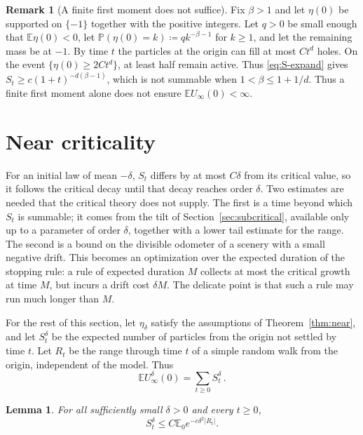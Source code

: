\documentclass[11pt]{amsart}
\theoremstyle{plain}
\newtheorem{lemma}[theorem]{Lemma}
\theoremstyle{definition}
\newtheorem{remark}[theorem]{Remark}
\newcommand{\E}{\mathbb{E}}
\renewcommand{\P}{\mathbb{P}}
\begin{document}
\begin{remark}[A finite first moment does not suffice]\label{rem:first-moment}
	Fix $\beta>1$ and let $\eta(0)$ be supported on $\{-1\}$ together with
	the positive integers. Let $q>0$ be small enough that
	$\E\eta(0)<0$, let $\P(\eta(0)=k)\coloneqq qk^{-\beta-1}$ for $k\geq1$,
	and let the remaining mass be at $-1$. By time $t$ the
	particles at the origin can fill at most $Ct^d$ holes. On the event
	$\{\eta(0)\geq2Ct^d\}$, at least half remain active. Thus
	\eqref{eq:S-expand} gives $S_t\geq c(1+t)^{-d(\beta-1)}$, which is not
	summable when $1<\beta\leq1+1/d$. Thus a finite first moment alone does not
	ensure $\E U_\infty(0)<\infty$.
\end{remark}

\section{Near criticality}\label{sec:near}

For an initial law of mean $-\delta$, $S_t$ differs by at most $C\delta$ from
its critical value, so it follows the critical decay until that decay reaches
order $\delta$. Two estimates are needed that the
critical theory does not supply. The first is a time beyond which $S_t$
is summable; it comes from the tilt of Section~\ref{sec:subcritical},
available only up to a parameter of order $\delta$, together with a lower tail
estimate for the range. The second is a bound on the divisible odometer of a
scenery with a small negative drift. This becomes an optimization over the expected duration of the stopping rule: a rule of expected duration $M$ collects at most the critical growth at time $M$, but incurs a drift cost $\delta M$. The delicate point is that such a rule may
run much longer than $M$.

For the rest of this section, let $\eta_\delta$ satisfy the assumptions of
Theorem~\ref{thm:near}, and let $S_t^\delta$ be the expected number of particles
from the origin not settled by time $t$. Let $R_t$ be the range through time
$t$ of a simple random walk from the origin, independent of the model. Thus
\[
	\E U_\infty^\delta(0)=\sum_{t\geq0}S_t^\delta\,.
\]

\begin{lemma}\label{lem:near-tilt}
	For all sufficiently small $\delta>0$ and every $t\geq0$,
	\[
		S_t^\delta\leq C\E_0e^{-c\delta^2|R_t|}.
	\]
\end{lemma}
\end{document}
